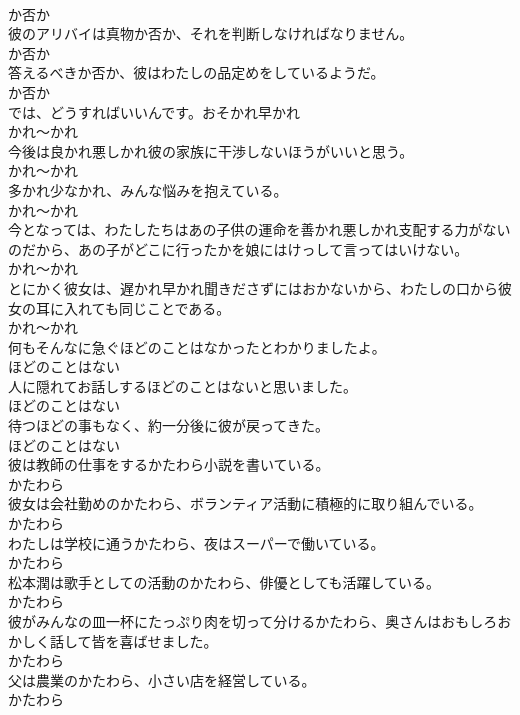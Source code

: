 \documentclass[8pt]{extreport}
\begin{document}
\begin{CJK}{UTF8}{min}
\\	か否か
\\	彼のアリバイは真物か否か、それを判断しなければなりません。	
\\	か否か
\\	答えるべきか否か、彼はわたしの品定めをしているようだ。	
\\	か否か
\\	では、どうすればいいんです。おそかれ早かれ
\\	かれ～かれ
\\	今後は良かれ悪しかれ彼の家族に干渉しないほうがいいと思う。	
\\	かれ～かれ
\\	多かれ少なかれ、みんな悩みを抱えている。	
\\	かれ～かれ
\\	今となっては、わたしたちはあの子供の運命を善かれ悪しかれ支配する力がないのだから、あの子がどこに行ったかを娘にはけっして言ってはいけない。	
\\	かれ～かれ
\\	とにかく彼女は、遅かれ早かれ聞きださずにはおかないから、わたしの口から彼女の耳に入れても同じことである。	
\\	かれ～かれ
\\	何もそんなに急ぐほどのことはなかったとわかりましたよ。	
\\	ほどのことはない
\\	人に隠れてお話しするほどのことはないと思いました。	
\\	ほどのことはない
\\	待つほどの事もなく、約一分後に彼が戻ってきた。	
\\	ほどのことはない
\\	彼は教師の仕事をするかたわら小説を書いている。	
\\	かたわら
\\	彼女は会社勤めのかたわら、ボランティア活動に積極的に取り組んでいる。	
\\	かたわら
\\	わたしは学校に通うかたわら、夜はスーパーで働いている。	
\\	かたわら
\\	松本潤は歌手としての活動のかたわら、俳優としても活躍している。	
\\	かたわら
\\	彼がみんなの皿一杯にたっぷり肉を切って分けるかたわら、奥さんはおもしろおかしく話して皆を喜ばせました。	
\\	かたわら
\\	父は農業のかたわら、小さい店を経営している。	
\\	かたわら

\end{CJK}
\end{document}
